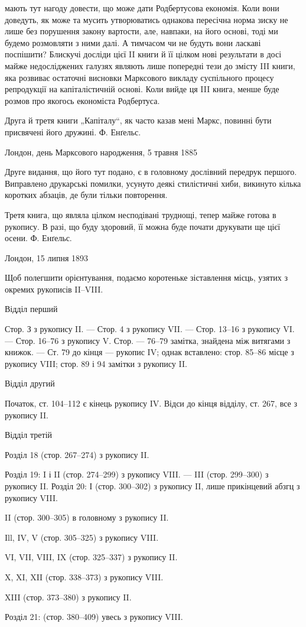 \parcont{}  %
мають тут нагоду довести, що може дати Родбертусова економія. Коли
вони доведуть, як може та мусить утворюватись однакова пересічна
норма зиску не лише без порушення закону вартости, але, навпаки, на
його основі, тоді ми будемо розмовляти з ними далі. А тимчасом чи не
будуть вони ласкаві поспішити? Блискучі досліди цієї II книги й її цілком
нові результати в досі майже недосліджених галузях являють лише
попередні тези до змісту III книги, яка розвиває остаточні висновки Марксового
викладу суспільного процесу репродукції на капіталістичній
основі. Коли вийде ця III книга, менше буде розмов про якогось економіста
Родбертуса.

Друга й третя книги „Капіталу“, як часто казав мені Маркс, повинні
бути присвячені його дружині.
Ф. Енґельс.

Лондон, день Марксового народження, 5 травня 1885~

Друге видання, що його тут подано, є в головному дослівний передрук
першого. Виправлено друкарські помилки, усунуто деякі стилістичні
хиби, викинуто кілька коротких абзаців, де були тільки повторення.

Третя книга, що являла цілком несподівані труднощі, тепер майже
готова в рукопису. В разі, що буду здоровий, її можна буде почати
друкувати ще цієї осени. Ф. Енґельс.

Лондон, 15 липня 1893~

Щоб полегшити орієнтування, подаємо коротеньке зіставлення місць,
узятих з окремих рукописів II--VIII.

Відділ перший

Стор. З з рукопису II. — Стор. 4 з рукопису VII. — Стор. 13--16
з рукопису VI. — Стор. 16--76 з рукопису V. Стор. — 76--79 замітка, знайдена
між витягами з книжок. — Ст. 79 до кінця — рукопис IV; однак
вставлено: стор. 85--86 місце з рукопису VIII; стор. 89 і 94 замітки з
рукопису II.

Відділ другий

Початок, ст. 104--112 є кінець рукопису IV. Відси до кінця відділу,
ст. 267, все з рукопису II.

Відділ третій

Розділ 18 (стор. 267--274) з рукопису II.

Розділ 19: I і II (стор. 274--299) з рукопису VIII. — III (стор. 299--300)
з рукопису II.
Розділ 20: І (стор. 300--302) з рукопису II, лише прикінцевий
абзгц з рукопису VIII.

II (стор. 300--305) в головному з рукопису II.

Ill, IV, V (стор. 305--325) з рукопису VIII.

VI, VII, VIII, IX (стор. 325--337) з рукопису II.

X, XI, XII (стор. 338--373) з рукопису VIII.

XIII (стор. 373--380) з рукопису II.

Розділ 21: (стор. 380--409) увесь з рукопису VIII.
\parbreak{}  %
